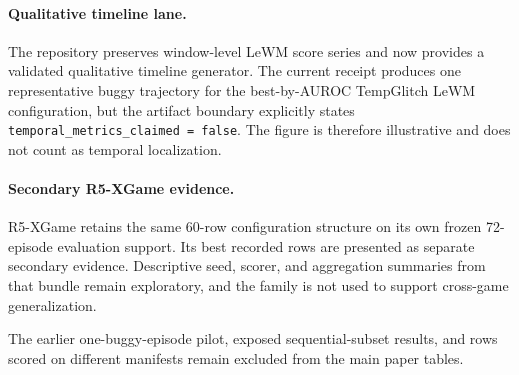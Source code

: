\paragraph{Qualitative timeline lane.}
The repository preserves window-level LeWM score series and now provides a validated qualitative
timeline generator. The current receipt produces one representative buggy trajectory for the
best-by-AUROC TempGlitch LeWM configuration, but the artifact boundary explicitly states
\texttt{temporal\_metrics\_claimed = false}. The figure is therefore illustrative and does not
count as temporal localization.

\paragraph{Secondary R5-XGame evidence.}
R5-XGame retains the same 60-row configuration structure on its own frozen 72-episode evaluation
support. Its best recorded rows are presented as separate secondary evidence. Descriptive seed,
scorer, and aggregation summaries from that bundle remain exploratory, and the family is not used
to support cross-game generalization.

The earlier one-buggy-episode pilot, exposed sequential-subset results, and rows scored on
different manifests remain excluded from the main paper tables.

